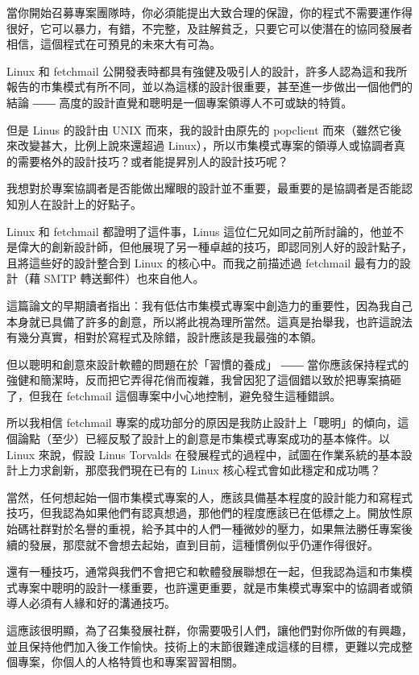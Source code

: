 \documentclass[12pt, a5paper]{book}
\begin{document}
當你開始召募專案團隊時，你必須能提出大致合理的保證，你的程式不需要運作得很好，它可以暴力，有錯，不完整，及註解貧乏，只要它可以使潛在的協同發展者相信，這個程式在可預見的未來大有可為。

Linux 和 fetchmail
公開發表時都具有強健及吸引人的設計，許多人認為這和我所報告的市集模式有所不同，並以為這樣的設計很重要，甚至進一步做出一個他們的結論
―― 高度的設計直覺和聰明是一個專案領導人不可或缺的特質。

但是 Linus 的設計由 UNIX 而來，我的設計由原先的 popclient
而來（雖然它後來改變甚大，比例上說來還超過
Linux），所以市集模式專案的領導人或協調者真的需要格外的設計技巧？或者能提昇別人的設計技巧呢？

我想對於專案協調者是否能做出耀眼的設計並不重要，最重要的是協調者是否能認知別人在設計上的好點子。

Linux 和 fetchmail 都證明了這件事，Linus
這位仁兄如同之前所討論的，他並不是偉大的創新設計師，但他展現了另一種卓越的技巧，即認同別人好的設計點子，且將這些好的設計整合到
Linux 的核心中。而我之前描述過 fetchmail 最有力的設計（藉 SMTP
轉送郵件）也來自他人。

這篇論文的早期讀者指出︰我有低估市集模式專案中創造力的重要性，因為我自己本身就已具備了許多的創意，所以將此視為理所當然。這真是抬舉我，也許這說法有幾分真實，相對於寫程式及除錯，設計應該是我最強的本領。

但以聰明和創意來設計軟體的問題在於「習慣的養成」 ――
當你應該保持程式的強健和簡潔時，反而把它弄得花俏而複雜，我曾因犯了這個錯以致於把專案搞砸了，但我在
fetchmail 這個專案中小心地控制，避免發生這種錯誤。

所以我相信 fetchmail
專案的成功部分的原因是我防止設計上「聰明」的傾向，這個論點（至少）已經反駁了設計上的創意是市集模式專案成功的基本條件。以
Linux 來說，假設 Linus Torvalds
在發展程式的過程中，試圖在作業系統的基本設計上力求創新，那麼我們現在已有的
Linux 核心程式會如此穩定和成功嗎？

當然，任何想起始一個市集模式專案的人，應該具備基本程度的設計能力和寫程式技巧，但我認為如果他們有認真想過，那他們的程度應該已在低標之上。開放性原始碼社群對於名譽的重視，給予其中的人們一種微妙的壓力，如果無法勝任專案後續的發展，那麼就不會想去起始，直到目前，這種慣例似乎仍運作得很好。

還有一種技巧，通常與我們不會把它和軟體發展聯想在一起，但我認為這和市集模式專案中聰明的設計一樣重要，也許還更重要，就是市集模式專案中的協調者或領導人必須有人緣和好的溝通技巧。

這應該很明顯，為了召集發展社群，你需要吸引人們，讓他們對你所做的有興趣，並且保持他們加入後工作愉快。技術上的末節很難達成這樣的目標，更難以完成整個專案，你個人的人格特質也和專案習習相關。
\end{document}

